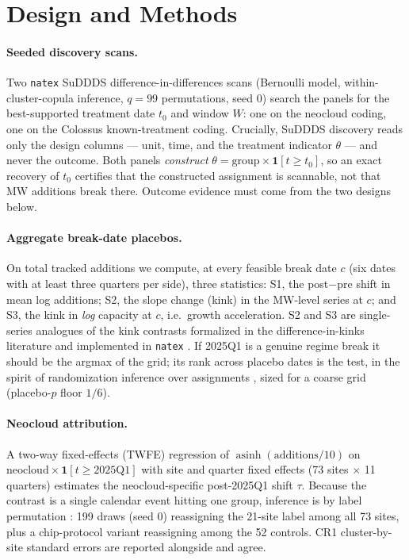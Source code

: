 \documentclass[11pt]{article}
\newcommand{\natex}{\texttt{natex}}
\begin{document}
\section{Design and Methods}\label{sec:methods}

\paragraph{Seeded discovery scans.} Two \natex{} \cite{natex} SuDDDS
difference-in-differences scans (Bernoulli model, within-cluster-copula
inference, $q=99$ permutations, seed 0) search the panels for the
best-supported treatment date $t_0$ and window $W$: one on the neocloud
coding, one on the Colossus known-treatment coding. Crucially, SuDDDS
discovery reads only the design columns --- unit, time, and the treatment
indicator $\theta$ --- and never the outcome. Both panels \emph{construct}
$\theta = \text{group} \times \mathbf{1}[t \geq t_0]$, so an exact recovery of
$t_0$ certifies that the constructed assignment is scannable, not that MW
additions break there. Outcome evidence must come from the two designs below.

\paragraph{Aggregate break-date placebos.} On total tracked additions we
compute, at every feasible break date $c$ (six dates with at least three
quarters per side), three statistics: S1, the post$-$pre shift in mean log
additions; S2, the slope change (kink) in the MW-level series at $c$; and S3,
the kink in \emph{log} capacity at $c$, i.e.\ growth acceleration. S2 and S3
are single-series analogues of the kink contrasts formalized in the
difference-in-kinks literature \cite{bockerman2025} and implemented in
\natex{} \cite{natex}. If 2025Q1 is a genuine regime break it should be the
argmax of the grid; its rank across placebo dates is the test, in the spirit
of randomization inference over assignments \cite{conleytaber2011}, sized for
a coarse grid (placebo-$p$ floor $1/6$).

\paragraph{Neocloud attribution.} A two-way fixed-effects (TWFE) regression of
$\operatorname{asinh}(\text{additions}/10)$ on
$\text{neocloud} \times \mathbf{1}[t \geq 2025\text{Q1}]$ with site and
quarter fixed effects (73 sites $\times$ 11 quarters) estimates the
neocloud-specific post-2025Q1 shift $\tau$. Because the contrast is a single
calendar event hitting one group, inference is by label permutation
\cite{conleytaber2011}: 199 draws (seed 0) reassigning the 21-site label among
all 73 sites, plus a chip-protocol variant reassigning among the 52 controls.
CR1 cluster-by-site standard errors are reported alongside and agree.
\end{document}
